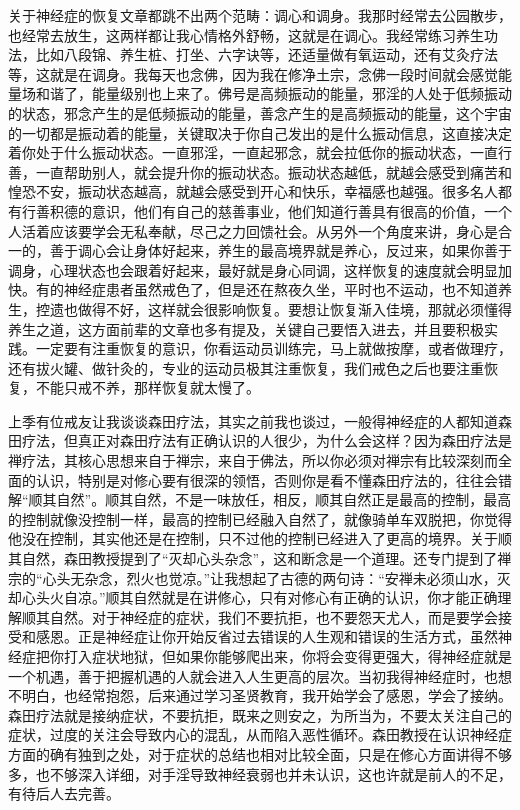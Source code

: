 关于神经症的恢复文章都跳不出两个范畴：调心和调身。我那时经常去公园散步，也经常去放生，这两样都让我心情格外舒畅，这就是在调心。我经常练习养生功法，比如八段锦、养生桩、打坐、六字诀等，还适量做有氧运动，还有艾灸疗法等，这就是在调身。我每天也念佛，因为我在修净土宗，念佛一段时间就会感觉能量场和谐了，能量级别也上来了。佛号是高频振动的能量，邪淫的人处于低频振动的状态，邪念产生的是低频振动的能量，善念产生的是高频振动的能量，这个宇宙的一切都是振动着的能量，关键取决于你自己发出的是什么振动信息，这直接决定着你处于什么振动状态。一直邪淫，一直起邪念，就会拉低你的振动状态，一直行善，一直帮助别人，就会提升你的振动状态。振动状态越低，就越会感受到痛苦和惶恐不安，振动状态越高，就越会感受到开心和快乐，幸福感也越强。很多名人都有行善积德的意识，他们有自己的慈善事业，他们知道行善具有很高的价值，一个人活着应该要学会无私奉献，尽己之力回馈社会。从另外一个角度来讲，身心是合一的，善于调心会让身体好起来，养生的最高境界就是养心，反过来，如果你善于调身，心理状态也会跟着好起来，最好就是身心同调，这样恢复的速度就会明显加快。有的神经症患者虽然戒色了，但是还在熬夜久坐，平时也不运动，也不知道养生，控遗也做得不好，这样就会很影响恢复。要想让恢复渐入佳境，那就必须懂得养生之道，这方面前辈的文章也多有提及，关键自己要悟入进去，并且要积极实践。一定要有注重恢复的意识，你看运动员训练完，马上就做按摩，或者做理疗，还有拔火罐、做针灸的，专业的运动员极其注重恢复，我们戒色之后也要注重恢复，不能只戒不养，那样恢复就太慢了。

上季有位戒友让我谈谈森田疗法，其实之前我也谈过，一般得神经症的人都知道森田疗法，但真正对森田疗法有正确认识的人很少，为什么会这样？因为森田疗法是禅疗法，其核心思想来自于禅宗，来自于佛法，所以你必须对禅宗有比较深刻而全面的认识，特别是对修心要有很深的领悟，否则你是看不懂森田疗法的，往往会错解“顺其自然”。顺其自然，不是一味放任，相反，顺其自然正是最高的控制，最高的控制就像没控制一样，最高的控制已经融入自然了，就像骑单车双脱把，你觉得他没在控制，其实他还是在控制，只不过他的控制已经进入了更高的境界。关于顺其自然，森田教授提到了“灭却心头杂念”，这和断念是一个道理。还专门提到了禅宗的“心头无杂念，烈火也觉凉。”让我想起了古德的两句诗：“安禅未必须山水，灭却心头火自凉。”顺其自然就是在讲修心，只有对修心有正确的认识，你才能正确理解顺其自然。对于神经症的症状，我们不要抗拒，也不要怨天尤人，而是要学会接受和感恩。正是神经症让你开始反省过去错误的人生观和错误的生活方式，虽然神经症把你打入症状地狱，但如果你能够爬出来，你将会变得更强大，得神经症就是一个机遇，善于把握机遇的人就会进入人生更高的层次。当初我得神经症时，也想不明白，也经常抱怨，后来通过学习圣贤教育，我开始学会了感恩，学会了接纳。森田疗法就是接纳症状，不要抗拒，既来之则安之，为所当为，不要太关注自己的症状，过度的关注会导致内心的混乱，从而陷入恶性循环。森田教授在认识神经症方面的确有独到之处，对于症状的总结也相对比较全面，只是在修心方面讲得不够多，也不够深入详细，对手淫导致神经衰弱也并未认识，这也许就是前人的不足，有待后人去完善。

